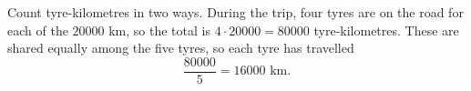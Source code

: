 Count tyre-kilometres in two ways. During the trip, four tyres are on the road for each of the $20000$ km, so the total is $4\cdot20000=80000$ tyre-kilometres. These are shared equally among the five tyres, so each tyre has travelled
\[\dfrac{80000}{5}=\boxed{16000\text{ km}}.\]
